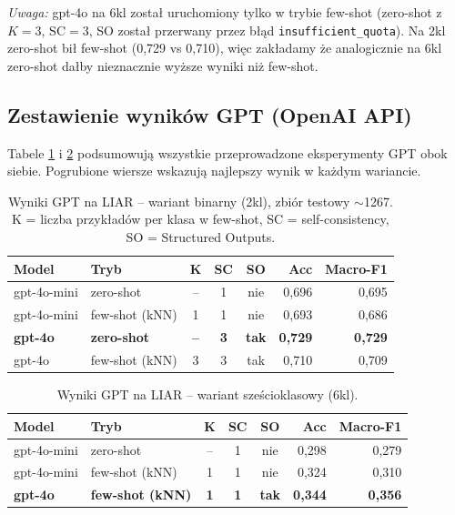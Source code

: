 \documentclass[11pt,a4paper]{article}
\begin{document}
\emph{Uwaga:} gpt-4o na 6kl został uruchomiony tylko w trybie few-shot
(zero-shot z $K=3$, $\text{SC}=3$, SO został przerwany przez błąd
\texttt{insufficient\_quota}). Na 2kl zero-shot bił few-shot (0{,}729 vs
0{,}710), więc zakładamy że analogicznie na 6kl zero-shot dałby
nieznacznie wyższe wyniki niż few-shot.

\subsection{Zestawienie wyników GPT (OpenAI API)}\label{sec:gpt_summary}

Tabele \ref{tab:gpt_2cl} i \ref{tab:gpt_6cl} podsumowują wszystkie
przeprowadzone eksperymenty GPT obok siebie. Pogrubione wiersze
wskazują najlepszy wynik w każdym wariancie.

\begin{table}[h]
\centering
\caption{Wyniki GPT na LIAR -- wariant binarny (2kl), zbiór testowy
$\sim$1267. K = liczba przykładów per klasa w few-shot, SC =
self-consistency, SO = Structured Outputs.}
\label{tab:gpt_2cl}
\begin{tabular}{llcccrr}
\toprule
Model & Tryb & K & SC & SO & Acc & Macro-F1 \\
\midrule
gpt-4o-mini & zero-shot      & -- & 1 & nie & 0{,}696 & 0{,}695 \\
gpt-4o-mini & few-shot (kNN) & 1  & 1 & nie & 0{,}693 & 0{,}686 \\
\textbf{gpt-4o} & \textbf{zero-shot} & \textbf{--} & \textbf{3} & \textbf{tak} & \textbf{0{,}729} & \textbf{0{,}729} \\
gpt-4o      & few-shot (kNN) & 3  & 3 & tak & 0{,}710 & 0{,}709 \\
\bottomrule
\end{tabular}
\end{table}

\begin{table}[h]
\centering
\caption{Wyniki GPT na LIAR -- wariant sześcioklasowy (6kl).}
\label{tab:gpt_6cl}
\begin{tabular}{llcccrr}
\toprule
Model & Tryb & K & SC & SO & Acc & Macro-F1 \\
\midrule
gpt-4o-mini & zero-shot      & -- & 1 & nie & 0{,}298 & 0{,}279 \\
gpt-4o-mini & few-shot (kNN) & 1  & 1 & nie & 0{,}324 & 0{,}310 \\
\textbf{gpt-4o} & \textbf{few-shot (kNN)} & \textbf{1}  & \textbf{1} & \textbf{tak} & \textbf{0{,}344} & \textbf{0{,}356} \\
\bottomrule
\end{tabular}
\end{table}
\end{document}

